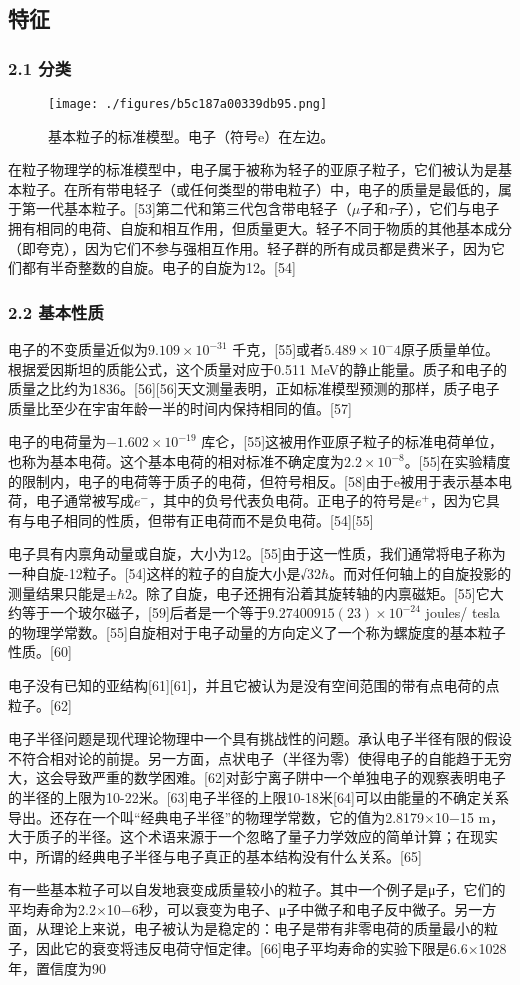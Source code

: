 \subsection{特征}
\subsubsection{2.1 分类}
\begin{figure}[ht]
\centering
\texttt{[image: ./figures/b5c187a00339db95.png]}
\caption{基本粒子的标准模型。电子（符号e）在左边。} \label{fig_DZ_5}
\end{figure}
在粒子物理学的标准模型中，电子属于被称为轻子的亚原子粒子，它们被认为是基本粒子。在所有带电轻子（或任何类型的带电粒子）中，电子的质量是最低的，属于第一代基本粒子。[53]第二代和第三代包含带电轻子（$\mu$子和$\tau$子），它们与电子拥有相同的电荷、自旋和相互作用，但质量更大。轻子不同于物质的其他基本成分（即夸克），因为它们不参与强相互作用。轻子群的所有成员都是费米子，因为它们都有半奇整数的自旋。电子的自旋为12。[54]
\subsubsection{2.2 基本性质}
电子的不变质量近似为$9.109\times10^{-31}$ 千克，[55]或者$5.489\times10^-4$原子质量单位。根据爱因斯坦的质能公式，这个质量对应于0.511 MeV的静止能量。质子和电子的质量之比约为1836。[56][56]天文测量表明，正如标准模型预测的那样，质子电子质量比至少在宇宙年龄一半的时间内保持相同的值。[57]

电子的电荷量为$-1.602\times10^{-19}$ 库仑，[55]这被用作亚原子粒子的标准电荷单位，也称为基本电荷。这个基本电荷的相对标准不确定度为$2.2\times10^{-8}$。[55]在实验精度的限制内，电子的电荷等于质子的电荷，但符号相反。[58]由于e被用于表示基本电荷，电子通常被写成$e^-$，其中的负号代表负电荷。正电子的符号是$e^+$，因为它具有与电子相同的性质，但带有正电荷而不是负电荷。[54][55]

电子具有内禀角动量或自旋，大小为12。[55]由于这一性质，我们通常将电子称为一种自旋-12粒子。[54]这样的粒子的自旋大小是√32$\hbar$。而对任何轴上的自旋投影的测量结果只能是$\pm\hbar2$。除了自旋，电子还拥有沿着其旋转轴的内禀磁矩。[55]它大约等于一个玻尔磁子，[59]后者是一个等于$9.27400915(23)\times10^{-24}$ joules/ tesla的物理学常数。[55]自旋相对于电子动量的方向定义了一个称为螺旋度的基本粒子性质。[60]

电子没有已知的亚结构[61][61]，并且它被认为是没有空间范围的带有点电荷的点粒子。[62]

电子半径问题是现代理论物理中一个具有挑战性的问题。承认电子半径有限的假设不符合相对论的前提。另一方面，点状电子（半径为零）使得电子的自能趋于无穷大，这会导致严重的数学困难。[62]对彭宁离子阱中一个单独电子的观察表明电子的半径的上限为10-22米。[63]电子半径的上限10-18米[64]可以由能量的不确定关系导出。还存在一个叫“经典电子半径”的物理学常数，它的值为2.8179×10−15 m，大于质子的半径。这个术语来源于一个忽略了量子力学效应的简单计算；在现实中，所谓的经典电子半径与电子真正的基本结构没有什么关系。[65]

有一些基本粒子可以自发地衰变成质量较小的粒子。其中一个例子是μ子，它们的平均寿命为2.2×10−6秒，可以衰变为电子、μ子中微子和电子反中微子。另一方面，从理论上来说，电子被认为是稳定的：电子是带有非零电荷的质量最小的粒子，因此它的衰变将违反电荷守恒定律。[66]电子平均寿命的实验下限是6.6×1028年，置信度为90%